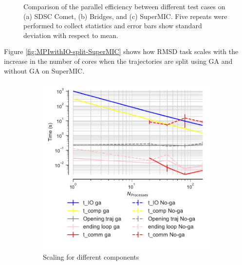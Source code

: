 \begin{figure}[ht!]
\caption{Comparison of the parallel efficiency between different test cases on (a) SDSC Comet, (b) Bridges, and (c) SuperMIC.
Five repeats were performed to collect statistics and error bars show standard deviation with respect to mean.}
\label{fig:comparison_efficiency}
\end{figure} 

Figure \ref{fig:MPIwithIO-split-SuperMIC} shows how RMSD task scales with the increase in the number of cores when the trajectories are split using GA and without GA on SuperMIC.  
 
 \begin{figure}[ht!]
\centering
\begin{subfigure}{.3\textwidth}
  \includegraphics[width=\linewidth]{figures/Comparison_IO_compute_scaling_traj_splitting-SuperMIC.pdf}
  \caption{Scaling for different components}
  \label{fig:MPIscaling-chain-reader}
\end{subfigure}
\hfill
\begin{subfigure}{.3\textwidth}

\end{subfigure}
\end{figure}
